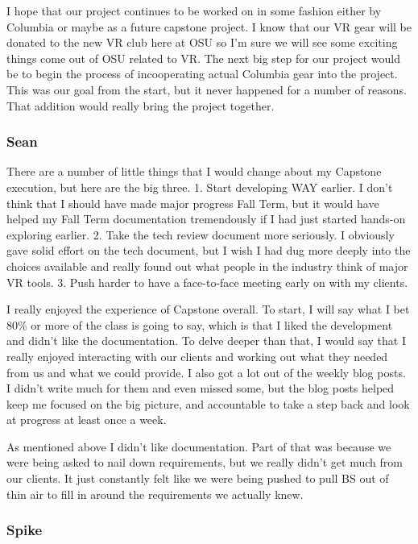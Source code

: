 \documentclass[10pt,journal,compsoc,onecolumn, draftclsnofoot]{IEEEtran}
\begin{document}
I hope that our project continues to be worked on in some fashion either by Columbia or maybe as a future capstone project. I know that our VR gear will be donated to the new VR club here at OSU so I'm sure we will see some exciting things come out of OSU related to VR. The next big step for our project would be to begin the process of incooperating actual Columbia gear into the project. This was our goal from the start, but it never happened for a number of reasons. That addition would really bring the project together.


\subsubsection{Sean}

There are a number of little things that I would change about my Capstone execution, but here are the big three.
1. Start developing WAY earlier. I don't think that I should have made major progress Fall Term, but it would have helped my Fall Term documentation tremendously if I had just started hands-on exploring earlier.
2. Take the tech review document more seriously. I obviously gave solid effort on the tech document, but I wish I had dug more deeply into the choices available and really found out what people in the industry think of major VR tools.
3. Push harder to have a face-to-face meeting early on with my clients.

I really enjoyed the experience of Capstone overall. To start, I will say what I bet 80\% or more of the class is going to say, which is that I liked the development and didn't like the documentation. To delve deeper than that, I would say that I really enjoyed interacting with our clients and working out what they needed from us and what we could provide. I also got a lot out of the weekly blog posts. I didn't write much for them and even missed some, but the blog posts helped keep me focused on the big picture, and accountable to take a step back and look at progress at least once a week.

As mentioned above I didn't like documentation. Part of that was because we were being asked to nail down requirements, but we really didn't get much from our clients. It just constantly felt like we were being pushed to pull BS out of thin air to fill in around the requirements we actually knew.

\subsubsection{Spike}
\end{document}
